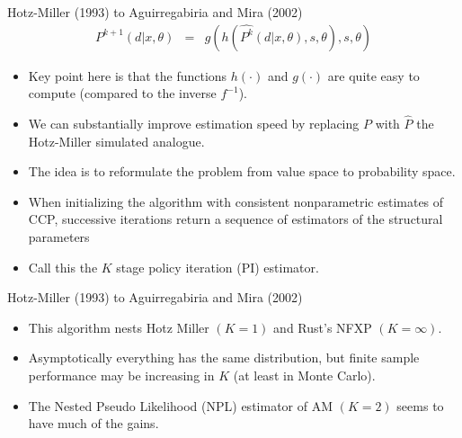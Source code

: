 \documentclass[xcolor=pdftex,dvipsnames,table,mathserif]{beamer}
\begin{document}
\begin{frame}{Hotz-Miller (1993) to Aguirregabiria and Mira (2002)}
\begin{eqnarray*}
P^{k+1}(d | x,\theta) &=& g(h(\hat{P^{k}}(d | x, \theta),s ,\theta),s,\theta)
\end{eqnarray*}
\vspace{-0.5cm}
\begin{itemize}
\item Key point here is that the functions $h(\cdot)$ and $g(\cdot)$ are quite easy to compute (compared to the inverse $f^{-1}$).
\item We can substantially improve estimation speed by replacing $P$ with $\hat{P}$ the Hotz-Miller simulated analogue.
\item The idea is to reformulate the problem from \alert{value space} to \alert{probability space}.
\item When initializing the algorithm with consistent nonparametric estimates of CCP, successive iterations return a sequence of estimators of the structural parameters
\item Call this the $K$ stage policy iteration (PI) estimator.
\end{itemize}
\end{frame}

\begin{frame}{Hotz-Miller (1993) to Aguirregabiria and Mira (2002)}
\begin{itemize}
\item This algorithm nests Hotz Miller $(K=1)$ and Rust's NFXP $(K=\infty)$.
\item Asymptotically everything has the same distribution, but finite sample performance may be increasing in $K$ (at least in Monte Carlo).
\item The Nested Pseudo Likelihood (NPL) estimator of AM $(K=2)$ seems to have much of the gains.
\end{itemize}
\end{frame}
\end{document}
